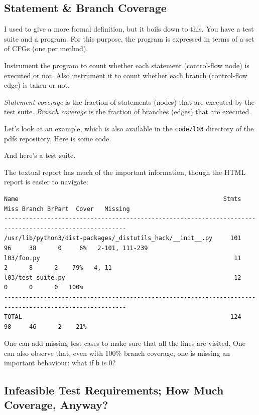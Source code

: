 \documentclass[11pt]{article}
\begin{document}
\subsection*{Statement \& Branch Coverage}

I used to give a more formal definition, but it boils down to this.
You have a test suite and a program. For this purpose, the program is
expressed in terms of a set of CFGs (one per method).

Instrument the program to count whether each statement (control-flow
node) is executed or not.  Also instrument it to count whether each
branch (control-flow edge) is taken or not.

\emph{Statement coverage} is the fraction of statements (nodes) that are
executed by the test suite. \emph{Branch coverage} is the fraction of branches (edges)
that are executed.

Let's look at an example, which is also available in the \texttt{code/l03} directory of the pdfs
repository. Here is some code.



And here's a test suite.



The textual report has much of the important information, though the HTML report is easier to navigate:

{\tiny
\begin{verbatim}
Name                                                         Stmts   Miss Branch BrPart  Cover   Missing
--------------------------------------------------------------------------------------------------------
/usr/lib/python3/dist-packages/_distutils_hack/__init__.py     101     96     38      0     6%   2-101, 111-239
l03/foo.py                                                      11      2      8      2    79%   4, 11
l03/test_suite.py                                               12      0      0      0   100%
--------------------------------------------------------------------------------------------------------
TOTAL                                                          124     98     46      2    21%
\end{verbatim}
}

One can add missing test cases to make sure that all the lines are visited. One can also observe
that, even with 100\% branch coverage, one is missing an important behaviour: what if \texttt{b} is 0?


\subsection*{Infeasible Test Requirements; How Much Coverage, Anyway?}
\end{document}
